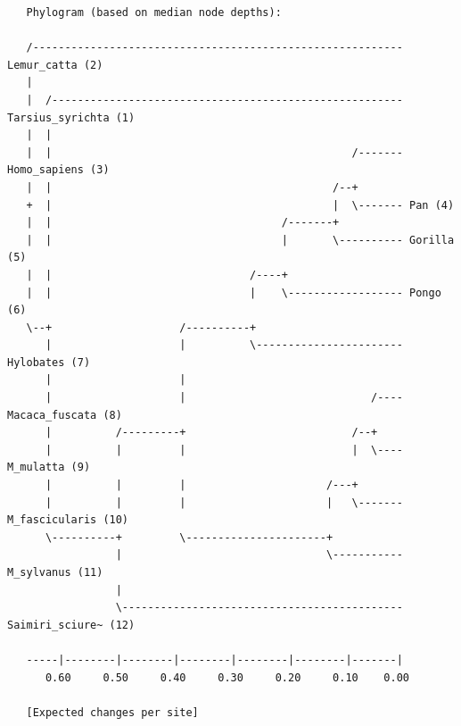 \documentclass[12pt]{book}
\begin{document}
\footnotesize
\begin{singlespacing}
\begin{verbatim}
   Phylogram (based on median node depths):

   /---------------------------------------------------------- Lemur_catta (2)
   |                                                                               
   |  /------------------------------------------------------- Tarsius_syrichta (1)
   |  |                                                                            
   |  |                                               /------- Homo_sapiens (3)
   |  |                                            /--+                            
   +  |                                            |  \------- Pan (4)
   |  |                                    /-------+                               
   |  |                                    |       \---------- Gorilla (5)
   |  |                               /----+                                       
   |  |                               |    \------------------ Pongo (6)
   \--+                    /----------+                                            
      |                    |          \----------------------- Hylobates (7)
      |                    |                                                       
      |                    |                             /---- Macaca_fuscata (8)
      |          /---------+                          /--+                         
      |          |         |                          |  \---- M_mulatta (9)
      |          |         |                      /---+                            
      |          |         |                      |   \------- M_fascicularis (10)
      \----------+         \----------------------+                                
                 |                                \----------- M_sylvanus (11)
                 |                                                                 
                 \-------------------------------------------- Saimiri_sciure~ (12)
                                                                                   
   -----|--------|--------|--------|--------|--------|-------|                     
      0.60     0.50     0.40     0.30     0.20     0.10    0.00                    

   [Expected changes per site]
\end{verbatim}
\end{singlespacing}
\normalsize
\end{document}
